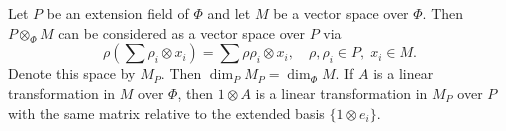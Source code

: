 Let $P$ be an extension field of $\Phi$ and let $M$ be a vector space over $\Phi$. Then $P \otimes_\Phi M$ can be considered as a vector space over $P$ via
$$\rho\left(\sum \rho_i \otimes x_i\right) = \sum \rho\rho_i \otimes x_i, \quad \rho, \rho_i \in P, \; x_i \in M.$$
Denote this space by $M_P$. Then $\dim_P M_P = \dim_\Phi M$. If $A$ is a linear transformation in $M$ over $\Phi$, then $1 \otimes A$ is a linear transformation in $M_P$ over $P$ with the same matrix relative to the extended basis $\{1 \otimes e_i\}$.
